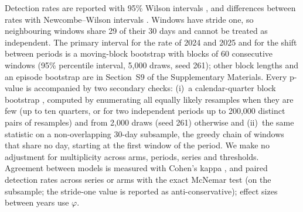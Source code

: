 Detection rates are reported with 95\% Wilson intervals \cite{brown2001interval}, and differences between rates with Newcombe--Wilson intervals \cite{newcombe1998interval}. Windows have stride one, so neighbouring windows share 29 of their 30 days and cannot be treated as independent. The primary interval for the rate of 2024 and 2025 and for the shift between periods is a moving-block bootstrap with blocks of 60 consecutive windows (95\% percentile interval, 5{,}000 draws, seed 261); other block lengths and an episode bootstrap are in Section~S9 of the Supplementary Materials. Every p-value is accompanied by two secondary checks: (i)~a calendar-quarter block bootstrap \cite{kunsch1989jackknife}, computed by enumerating all equally likely resamples when they are few (up to ten quarters, or for two independent periods up to 200{,}000 distinct pairs of resamples) and from 2{,}000 draws (seed 261) otherwise and (ii)~the same statistic on a non-overlapping 30-day subsample, the greedy chain of windows that share no day, starting at the first window of the period. We make no adjustment for multiplicity across arms, periods, series and thresholds. Agreement between models is measured with Cohen's kappa \cite{cohen1960coefficient}, and paired detection rates across series or arms with the exact McNemar test \cite{mcnemar1947note} (on the subsample; the stride-one value is reported as anti-conservative); effect sizes between years use $\varphi$. %
